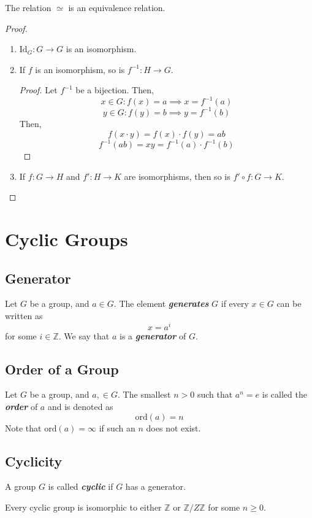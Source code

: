\documentclass{report}
\newcommand{\Z}{\mathbb{Z}}
\newcommand{\modclass}[1]{\Z/{#1}\Z}
\newcommand{\textib}[1]{\textit{\textbf{{#1}}}}
\newcommand{\Id}{\text{Id}}
\newcommand{\ord}{\text{ord}}
\newcommand{\theorem}[1]{\begin{tcolorbox}[title=\textit{Theorem}]{#1}\end{tcolorbox}}
\begin{document}
\theorem {
    The relation $\simeq$ is an equivalence relation.
}
\begin{proof}
\begin{enumerate}[label=\textit{(\roman*)}]
    \item $\Id_G : G \to G$ is an isomorphism.
    \item If $f$ is an isomorphism, so is $f^{-1} : H \to G$.
        \begin{proof}
            Let $f^{-1}$ be a bijection. Then,
            \[x \in G : f(x) = a \implies x = f^{-1}(a)\]
            \[y \in G : f(y) = b \implies y = f^{-1}(b)\]
            Then,
            \[f(x \cdot y) = f(x) \cdot f(y) = ab\]
            \[f^{-1}(ab) = xy = f^{-1}(a) \cdot f^{-1}(b)\]
        \end{proof}
    \item If $f : G \to H$ and $f' : H \to K$ are isomorphisms, then so is $f' \circ f : G \to K$. 
\end{enumerate}
\end{proof}





\section{Cyclic Groups}
\subsection{Generator}
Let $G$ be a group, and $a \in G$. The element \textib{generates} $G$ if every $x \in G$ can be 
written as 
\[x = a^i\]
for some $i \in \Z$. We say that $a$ is a \textib{generator} of $G$.


\subsection{Order of a Group}
Let $G$ be a group, and $a, \in G$. The smallest $n > 0$ such that $a^n = e$ is called the
\textib{order} of $a$ and is denoted as
\[\ord(a) = n\]
Note that $\ord(a) = \infty$ if such an $n$ does not exist.


\subsection{Cyclicity}
A group $G$ is called \textib{cyclic} if $G$ has a generator.

\theorem {
    Every cyclic group is isomorphic to either $\Z$ or $\modclass{Z}$ for some $n \geq 0$.
}
\end{document}
